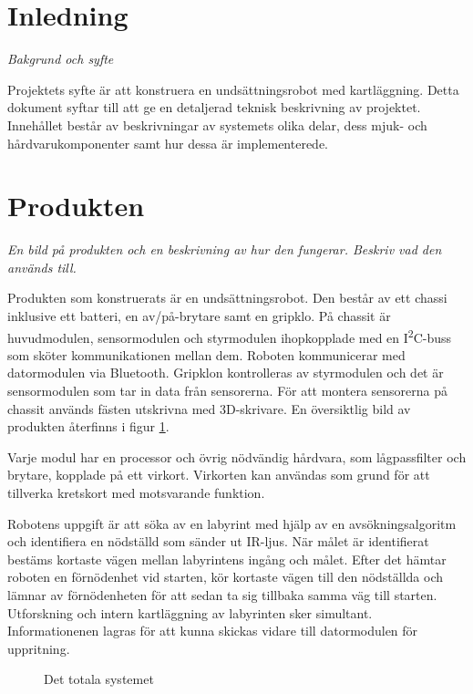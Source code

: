 \documentclass[11pt]{article}
\begin{document}
\begin{flushleft}
\section{Inledning}
\textit{Bakgrund och syfte}

Projektets syfte är att konstruera en undsättningsrobot med kartläggning. Detta dokument syftar till att ge en detaljerad teknisk beskrivning av projektet. Innehållet består av beskrivningar av systemets olika delar, dess mjuk- och hårdvarukomponenter samt hur dessa är implementerede.

\section{Produkten}
\textit{En bild på produkten och en beskrivning av hur den fungerar. Beskriv vad den används till.}

Produkten som konstruerats är en undsättningsrobot. Den består av ett chassi inklusive ett batteri, en av/på-brytare samt en gripklo. På chassit är huvudmodulen, sensormodulen och styrmodulen ihopkopplade med en I\textsuperscript{2}C-buss som sköter kommunikationen mellan dem. Roboten kommunicerar med datormodulen via Bluetooth\textsuperscript{\circledR}. Gripklon kontrolleras av styrmodulen och  det är sensormodulen som tar in data från sensorerna. För att montera sensorerna på chassit används fästen utskrivna med 3D-skrivare. En översiktlig bild av produkten återfinns i figur \ref{overview}.

Varje modul har en processor och övrig nödvändig hårdvara, som lågpassfilter och brytare, kopplade på ett virkort. Virkorten kan användas som grund för att tillverka kretskort med motsvarande funktion. 

Robotens uppgift är att söka av en labyrint med hjälp av en avsökningsalgoritm och identifiera en nödställd som sänder ut IR-ljus. När målet är identifierat bestäms kortaste vägen mellan labyrintens ingång och målet. Efter det hämtar roboten en förnödenhet vid starten, kör kortaste vägen till den nödställda och lämnar av förnödenheten för att sedan ta sig tillbaka samma väg till starten. Utforskning och intern kartläggning av labyrinten sker simultant. Informationenen lagras för att kunna skickas vidare till datormodulen för uppritning. 


\begin{figure}[!htbp]
\centering
\noindent\resizebox{\linewidth}{!}{
	}
	\caption{Det totala systemet \label{overview}}	
\end{figure}


\end{flushleft}
\end{document}
